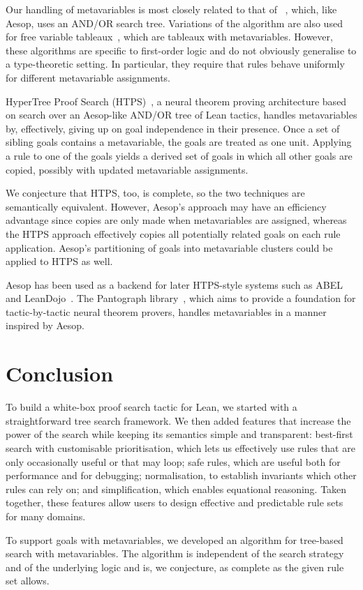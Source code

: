 Our handling of metavariables is most closely related to that of \Theorema~\cite{Konev05}, which, like Aesop, uses an AND/OR search tree.
Variations of the \Theorema{} algorithm are also used for free variable tableaux~\cite{Giese01}, which are tableaux with metavariables.
However, these algorithms are specific to first-order logic and do not obviously generalise to a type-theoretic setting.
In particular, they require that rules behave uniformly for different metavariable assignments.

HyperTree Proof Search (HTPS)~\cite{Lample22}, a neural theorem proving architecture based on search over an Aesop-like AND/OR tree of Lean tactics, handles metavariables by, effectively, giving up on goal independence in their presence.
Once a set of sibling goals contains a metavariable, the goals are treated as one unit.
Applying a rule to one of the goals yields a derived set of goals in which all other goals are copied, possibly with updated metavariable assignments.

We conjecture that HTPS, too, is complete, so the two techniques are semantically equivalent.
However, Aesop's approach may have an efficiency advantage since copies are only made when metavariables are assigned, whereas the HTPS approach effectively copies all potentially related goals on each rule application.
Aesop's partitioning of goals into metavariable clusters could be applied to HTPS as well.

Aesop has been used as a backend for later HTPS-style systems such as ABEL~\cite{ABEL} and LeanDojo~\cite{LeanDojo}.
The Pantograph library~\cite{Pantograph}, which aims to provide a foundation for tactic-by-tactic neural theorem provers, handles metavariables in a manner inspired by Aesop.


\section{Conclusion}%
\label{sec:aesop:conclusion}

To build a white-box proof search tactic for Lean, we started with a straightforward tree search framework.
We then added features that increase the power of the search while keeping its semantics simple and transparent: best-first search with customisable prioritisation, which lets us effectively use rules that are only occasionally useful or that may loop; safe rules, which are useful both for performance and for debugging; normalisation, to establish invariants which other rules can rely on; and simplification, which enables equational reasoning.
Taken together, these features allow users to design effective and predictable rule sets for many domains.

To support goals with metavariables, we developed an algorithm for tree-based search with metavariables.
The algorithm is independent of the search strategy and of the underlying logic and is, we conjecture, as complete as the given rule set allows.
